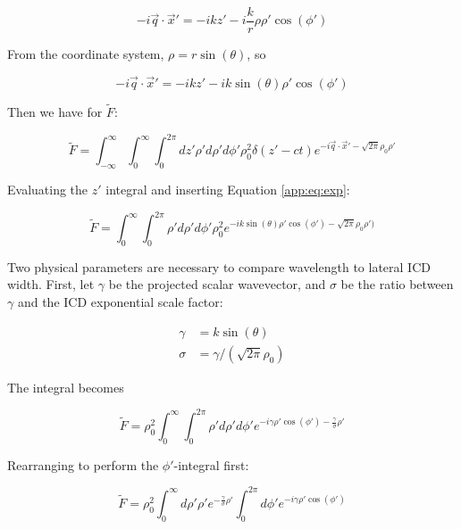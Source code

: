 \documentclass[amsmath,amssymb,aps,prd,10pt,twocolumn]{revtex4}
\begin{document}
\begin{equation}
-i \vec{q} \cdot \vec{x}' = -i k z'-i \frac{k}{r}\rho \rho' \cos(\phi')
\end{equation}

From the coordinate system, $\rho = r \sin(\theta)$, so

\begin{equation}
-i \vec{q} \cdot \vec{x}' = -i k z'-i k \sin(\theta) \rho' \cos(\phi') \label{app:eq:exp}
\end{equation}

Then we have for $\widetilde{F}$:

\begin{equation}
\widetilde{F} = \int_{-\infty}^{\infty} \int_{0}^{\infty} \int_{0}^{2\pi} dz' \rho' d\rho' d\phi' \rho_0^2 \delta(z' - ct) e^{-i \vec{q} \cdot \vec{x}' - \sqrt{2\pi}\rho_0 \rho'}
\end{equation}

Evaluating the $z'$ integral and inserting Equation \ref{app:eq:exp}:

\begin{equation}
\widetilde{F} = \int_{0}^{\infty} \int_{0}^{2\pi} \rho' d\rho' d\phi' \rho_0^2 e^{-i k\sin(\theta) \rho' \cos(\phi') - \sqrt{2\pi} \rho_0 \rho') }
\end{equation}

Two physical parameters are necessary to compare wavelength to lateral ICD width.  First, let $\gamma$ be the projected scalar wavevector, and $\sigma$ be the ratio between $\gamma$ and the ICD exponential scale factor:

\begin{align}
\gamma &= k \sin(\theta) \\
\sigma &= \gamma / (\sqrt{2\pi} \rho_0) \label{eq:sigma_1}
\end{align}

The integral becomes

\begin{equation}
\widetilde{F} = \rho_0^2 \int_{0}^{\infty} \int_{0}^{2\pi} \rho' d\rho' d\phi' e^{ -i\gamma \rho' \cos(\phi') - \frac{\gamma}{\sigma} \rho'}
\end{equation}

Rearranging to perform the $\phi'$-integral first:

\begin{equation}
\widetilde{F} = \rho_0^2 \int_0^{\infty} d\rho' \rho' e^{-\frac{\gamma}{\sigma}\rho'} \int_{0}^{2\pi} d\phi' e^{-i\gamma \rho' \cos(\phi')}
\end{equation}
\end{document}
